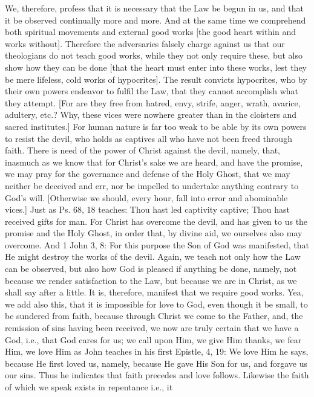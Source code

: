 We, therefore, profess that it is necessary that the Law be begun in
us, and that it be observed continually more and more.  And at the
same time we comprehend both spiritual movements and external good
works [the good heart within and works without].  Therefore the
adversaries falsely charge against us that our theologians do not
teach good works, while they not only require these, but also show
how they can be done [that the heart must enter into these works,
lest they be mere lifeless, cold works of hypocrites].  The result
convicts hypocrites, who by their own powers endeavor to fulfil the
Law, that they cannot accomplish what they attempt.  [For are they
free from hatred, envy, strife, anger, wrath, avarice, adultery, etc.?
Why, these vices were nowhere greater than in the cloisters and
sacred institutes.] For human nature is far too weak to be able by
its own powers to resist the devil, who holds as captives all who
have not been freed through faith.  There is need of the power of
Christ against the devil, namely, that, inasmuch as we know that for
Christ's sake we are heard, and have the promise, we may pray for the
governance and defense of the Holy Ghost, that we may neither be
deceived and err, nor be impelled to undertake anything contrary to
God's will.  [Otherwise we should, every hour, fall into error and
abominable vices.] Just as Ps. 68, 18 teaches: Thou hast led
captivity captive; Thou hast received gifts for man.  For Christ has
overcome the devil, and has given to us the promise and the Holy
Ghost, in order that, by divine aid, we ourselves also may overcome.
And 1 John 3, 8: For this purpose the Son of God was manifested, that
He might destroy the works of the devil.  Again, we teach not only
how the Law can be observed, but also how God is pleased if anything
be done, namely, not because we render satisfaction to the Law, but
because we are in Christ, as we shall say after a little.  It is,
therefore, manifest that we require good works.  Yea, we add also
this, that it is impossible for love to God, even though it be small,
to be sundered from faith, because through Christ we come to the
Father, and, the remission of sins having been received, we now are
truly certain that we have a God, i.e., that God cares for us; we
call upon Him, we give Him thanks, we fear Him, we love Him as John
teaches in his first Epistle, 4, 19: We love Him he says, because He
first loved us, namely, because He gave His Son for us, and forgave
us our sins.  Thus he indicates that faith precedes and love follows.
Likewise the faith of which we speak exists in repentance i.e., it
